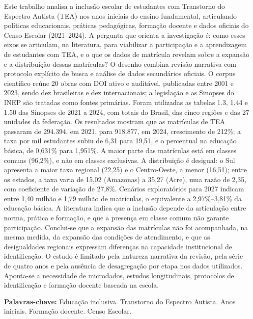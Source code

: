 \begingroup
{}
\noindent
Este trabalho analisa a inclusão escolar de estudantes com Transtorno do Espectro Autista (TEA) nos anos iniciais do ensino fundamental, articulando políticas educacionais, práticas pedagógicas, formação docente e dados oficiais do Censo Escolar (2021--2024). A pergunta que orienta a investigação é: como esses eixos se articulam, na literatura, para viabilizar a participação e a aprendizagem de estudantes com TEA, e o que os dados de matrícula revelam sobre a expansão e a distribuição dessas matrículas? O desenho combina revisão narrativa com protocolo explícito de busca e análise de dados secundários oficiais. O corpus científico reúne 20 obras com DOI ativo e auditável, publicadas entre 2001 e 2023, sendo dez brasileiras e dez internacionais; a legislação e as Sinopses do INEP são tratadas como fontes primárias. Foram utilizadas as tabelas 1.3, 1.44 e 1.50 das Sinopses de 2021 a 2024, com totais do Brasil, das cinco regiões e das 27 unidades da federação. Os resultados mostram que as matrículas de TEA passaram de 294.394, em 2021, para 918.877, em 2024, crescimento de 212\%; a taxa por mil estudantes subiu de 6,31 para 19,51, e o percentual na educação básica, de 0,631\% para 1,951\%. A maior parte das matrículas está em classes comuns (96,2\%), e não em classes exclusivas. A distribuição é desigual: o Sul apresenta a maior taxa regional (22,25) e o Centro-Oeste, a menor (16,51); entre os estados, a taxa varia de 15,02 (Amazonas) a 35,27 (Acre), uma razão de 2,35, com coeficiente de variação de 27,8\%. Cenários exploratórios para 2027 indicam entre 1,40 milhão e 1,79 milhão de matrículas, o equivalente a 2,97\%--3,81\% da educação básica. A literatura indica que a inclusão depende da articulação entre norma, prática e formação, e que a presença em classe comum não garante participação. Conclui-se que a expansão das matrículas não foi acompanhada, na mesma medida, da expansão das condições de atendimento, e que as desigualdades regionais expressam diferenças na capacidade institucional de identificação. O estudo é limitado pela natureza narrativa da revisão, pela série de quatro anos e pela ausência de desagregação por etapa nos dados utilizados. Aponta-se a necessidade de microdados, estudos longitudinais, protocolos de identificação e formação docente baseada na escola.

\vspace{1em}
\noindent\textbf{Palavras-chave:} Educação inclusiva. Transtorno do Espectro Autista. Anos iniciais. Formação docente. Censo Escolar.
\endgroup

